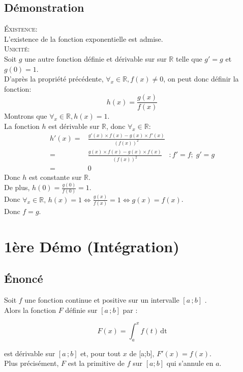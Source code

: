 \documentclass[12px]{article}
\newcommand\I{$[a\,;b]$ }
\begin{document}
	\subsection{Démonstration}
	\textsc{\'Existence:}\\
	L'existence de la fonction exponentielle est admise.\\
	\textsc{Unicité:}\\
	Soit $g$ une autre fonction définie et dérivable sur sur $\mathbb{R}$ telle que $g'=g$ et $g(0)=1$.\\
	D'après la propriété précédente, $\forall_x\in\mathbb{R}, f(x)\not=0$, on peut donc définir la fonction:
	\begin{displaymath}
		h(x)=\frac{g(x)}{f(x)}
	\end{displaymath}
	Montrons que $\forall_x\in\mathbb{R}, h(x)=1$.\\
	La fonction $h$ est dérivable sur $\mathbb{R}$, donc $\forall_x\in\mathbb{R}$:\\
	\begin{align*}
		h'(x)=&\frac{ g'(x)\times f(x) - g(x)\times f'(x) } { (f(x))^2 }\\
			 =&\frac{ g(x)\times f(x) - g(x)\times f(x) } { (f(x))^2 } \quad :f'=f;\; g'=g\\
			 =&0
	\end{align*}
	Donc $h$ est constante sur $\mathbb{R}$.\\
	De plus, $h(0)=\frac{g(0)}{f(0)}=1$.\\
	Donc $\forall_x\in\mathbb{R}, \,h(x)=1 \Leftrightarrow \frac{g(x)}{f(x)}=1 \Leftrightarrow g(x)= f(x)$.\\
	Donc $f=g$.
	
	\section{1ère Démo (Intégration)}
	
	\subsection{\'Enoncé}
	Soit $f$ une fonction continue et positive sur un intervalle \I.\\
	Alors la fonction $F$ définie sur \I par :
	\begin{center}
		\begin{displaymath}
			F(x) = \int_{a}^{x}f(t)\,\mathrm{dt}
		\end{displaymath}
	\end{center}
	est dérivable sur \I et, pour tout $x$ de [a;b], $F'(x)=f(x)$.\\
	Plus précisément, $F$ est la primitive de $f$ sur $[a;b]$ qui s'annule en $a$.
	
\end{document}
